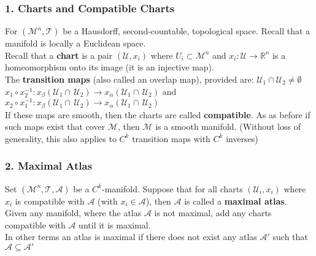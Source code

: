 \documentclass[11pt]{report}
\theoremstyle{thm}
\newcommand{\textem}[1]{\textcolor{mp}{\textbf{#1}}}
\begin{document}
\subsubsection{1. Charts and Compatible Charts}
For $(\mathcal{M}^n, \mathcal{T})$ be a Hausdorff, second-countable, 
topological 
space. Recall that a manifold is locally a Euclidean space.\\[1em]
Recall that a \textem{chart} is a pair $(\mathcal{U}, x_i) $ where $U_i 
\subset \mathcal{M}^n$ and $x_i: \mathcal{U} \rightarrow \mathbb{R}^n$ is a 
homeomorphism onto its image (it is an injective map).\\[1em]
The \textem{transition maps} (also called an overlap map), provided are:
$\mathcal{U}_1 
\cap \mathcal{U}_2 \ne \emptyset$\\
$x_1 \circ x_2^{-1} : 
x_\beta(\mathcal{U}_1 \cap\, \mathcal{U}_2) \rightarrow 
x_\alpha(\mathcal{U}_1 \cap\, \mathcal{U}_2)$ and
$x_2 \circ x_1^{-1} : 
x_\beta(\mathcal{U}_1 \cap\, \mathcal{U}_2) \rightarrow 
x_\alpha(\mathcal{U}_1 \cap\, \mathcal{U}_2)$\\[1em]
If these maps are smooth, then the charts are called \textem{compatible}. As as 
before if such maps exist that cover $\mathcal{M}$, then $\mathcal{M}$ is a 
smooth manifold. (Without loss of generality, this also applies to $C^k$ 
transition maps with $C^k$ inverses)
\subsubsection{2. Maximal Atlas}
Set $(\mathcal{M}^n, \mathcal{T}, \mathcal{A})$ be a $C^k$-manifold. Suppose 
that 
for all charts $(\mathcal{U}_i, x_i)$ where $x_i$ is compatible 
with $\mathcal{A}$ (with $x_i \in \mathcal{A}$), then 
$\mathcal{A}$ is called a \textem{maximal atlas}.\\[1em]
Given any manifold, where the atlas $\mathcal{A}$ is not maximal, add any 
charts compatible with $\mathcal{A}$ until it is maximal.\\[1em]
In other terms an atlas is maximal if there does not exist any atlas 
$\mathcal{A}'$ such that $\mathcal{A} \subseteq \mathcal{A}'$
\end{document}
